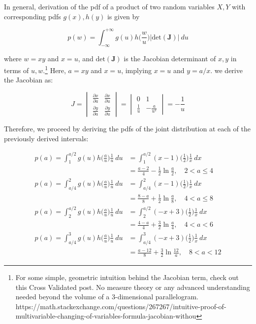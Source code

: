 \documentclass[10pt, oneside]{article}
\begin{document}
\begin{enumerate}[label=6.\arabic*]
In general, derivation of the pdf of a product of two random variables $X, Y$ with corresponding pdfs $g(x), h(y)$ is given by

\[ p(w) = \int^{+\infty}_{-\infty} g(u) h \Big( \frac{w}{u} \Big) \Big| \text{det} (\bm{J}) \Big| \ du \]

where $w = xy$ and $x = u$, and $\text{det}(\bm{J})$ is the Jacobian determinant of $x, y$ in terms of $u, w$.\footnote{For some simple, geometric intuition behind the Jacobian term, check out this Cross Validated post. No measure theory or any advanced understanding needed beyond the volume of a 3-dimensional parallelogram. https://math.stackexchange.com/questions/267267/intuitive-proof-of-multivariable-changing-of-variables-formula-jacobian-withou} Here, $a = xy$ and $x = u$, implying $x = u$ and $y = a/x$. we derive the Jacobian as:

\begingroup
\renewcommand*{\arraystretch}{3.5}
\[ J = \begin{vmatrix}
\frac{\partial x}{\partial a} & \frac{\partial x}{\partial u} \\
\frac{\partial y}{\partial a} & \frac{\partial y}{\partial u}
\end{vmatrix} = \begin{vmatrix}
0 & 1 \\
\frac{1}{u} & -\frac{a}{u^2}
\end{vmatrix} = -\frac{1}{u}
 \]
 \endgroup

Therefore, we proceed by deriving the pdfs of the joint distribution at each of the previously derived intervals:

\begin{align*}
p(a) = \int^{a/2}_1 g(u) h \Big( \frac{a}{u} \Big) \frac{1}{u} \ du &= \int^{a/2}_1 (x-1) \Big( \frac{1}{2} \Big) \frac{1}{x} \ dx \\
&= \boxed{ \frac{a-2}{4} - \frac{1}{2} \ln \frac{a}{2}, \quad 2 < a \leq 4 } \\
p(a) = \int^2_{a/4} g(u) h \Big( \frac{a}{u} \Big) \frac{1}{u} \ du &= \int^2_{a/4} (x-1) \Big( \frac{1}{2} \Big) \frac{1}{x} \ dx \\
&= \boxed{ \frac{8-a}{8} + \frac{1}{2} \ln \frac{a}{8}, \quad 4 < a \leq 8 } \\
p(a) = \int^{a/2}_2 g(u) h \Big( \frac{a}{u} \Big) \frac{1}{u} \ du &=  \int^{a/2}_2 (-x + 3) \Big( \frac{1}{2} \Big) \frac{1}{x} \ dx \\
&= \boxed{ \frac{4-a}{4} + \frac{3}{2} \ln \frac{a}{4}, \quad 4 < a < 6 } \\
p(a) = \int^3_{a/4} g(u) h \Big( \frac{a}{u} \Big) \frac{1}{u} \ du &= \int^3_{a/4} (-x + 3) \Big( \frac{1}{2} \Big) \frac{1}{x} \ dx \\
&= \boxed{ \frac{a-12}{8} + \frac{3}{2} \ln \frac{12}{a}, \quad 8 < a < 12 }
\end{align*}


\end{enumerate}
\end{document}
